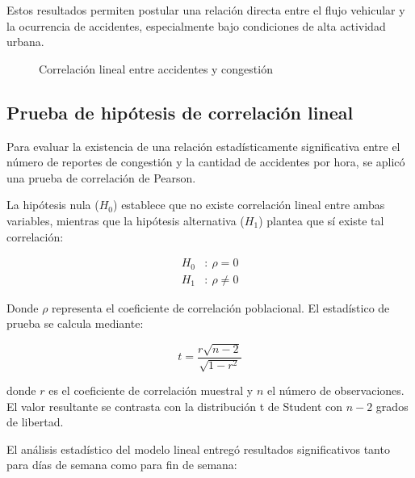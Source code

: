 \documentclass[12pt]{article}
\begin{document}
Estos resultados permiten postular una relación directa entre el flujo vehicular y la ocurrencia de accidentes, especialmente bajo condiciones de alta actividad urbana.


\begin{figure}[H]
    \centering
    \newline
    \newline
    \caption{Correlación lineal entre accidentes y congestión}
    \label{fig:corr_lineal}
\end{figure}

\subsection{Prueba de hipótesis de correlación lineal}

Para evaluar la existencia de una relación estadísticamente significativa entre el número de reportes de congestión y la cantidad de accidentes por hora, se aplicó una prueba de correlación de Pearson.

La hipótesis nula ($H_0$) establece que no existe correlación lineal entre ambas variables, mientras que la hipótesis alternativa ($H_1$) plantea que sí existe tal correlación:

\begin{align}
H_0&:\ \rho = 0 \\
H_1&:\ \rho \ne 0
\end{align}

Donde $\rho$ representa el coeficiente de correlación poblacional. El estadístico de prueba se calcula mediante:

\begin{equation}
t = \frac{r \sqrt{n - 2}}{\sqrt{1 - r^2}}
\end{equation}

donde $r$ es el coeficiente de correlación muestral y $n$ el número de observaciones. El valor resultante se contrasta con la distribución t de Student con $n - 2$ grados de libertad.

El análisis estadístico del modelo lineal entregó resultados significativos tanto para días de semana como para fin de semana:
\end{document}
